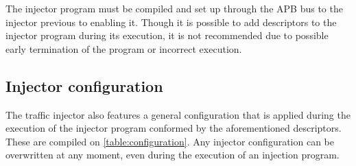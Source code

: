 The injector program must be compiled and set up through the APB bus to the injector previous to enabling it. 
Though it is possible to add descriptors to the injector program during its execution, it is not recommended due to possible early termination of the program 
or incorrect execution.


\subsection{Injector configuration}
\label{module desc-config}

The traffic injector also features a general configuration that is applied during the execution of the injector program conformed by the aforementioned 
descriptors. These are compiled on \autoref{table:configuration}. 
Any injector configuration can be overwritten at any moment, even during the execution of an injection program.

